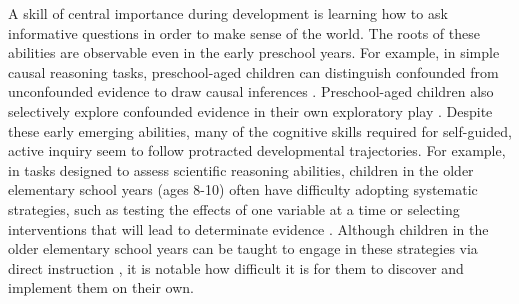\documentclass[man,floatsintext]{apa6}
\begin{document}


A skill of central importance during development is learning how to ask informative questions
in order to make sense of the world.  
The roots of these abilities are observable even in the early preschool years. 
For example, in simple causal reasoning tasks, preschool-aged children can 
distinguish confounded from unconfounded evidence to draw causal inferences 
\cite{Gopnik:2001,Kushnir:2005,Kushnir:2007,Schulz:2004}. Preschool-aged 
children also selectively explore confounded evidence in their own exploratory play 
\cite{Cook:2011,Gweon:2008,Schulz:2007}. 
%
Despite these early emerging abilities, many of the cognitive skills required for self-guided, active inquiry seem
to follow protracted developmental trajectories. For example, in tasks designed to assess scientific 
reasoning abilities, children in the older elementary school years (ages 8-10) often 
have difficulty adopting systematic strategies, such as testing the effects of one 
variable at a time or selecting interventions that will lead to determinate evidence 
\cite{Chen:1999}. Although children in the older elementary school years can be 
taught to engage in these strategies via direct instruction \cite{Klahr:2004,Kuhn:2005}, 
it is notable how difficult it is for them to discover and implement them on their own. 
\end{document}
